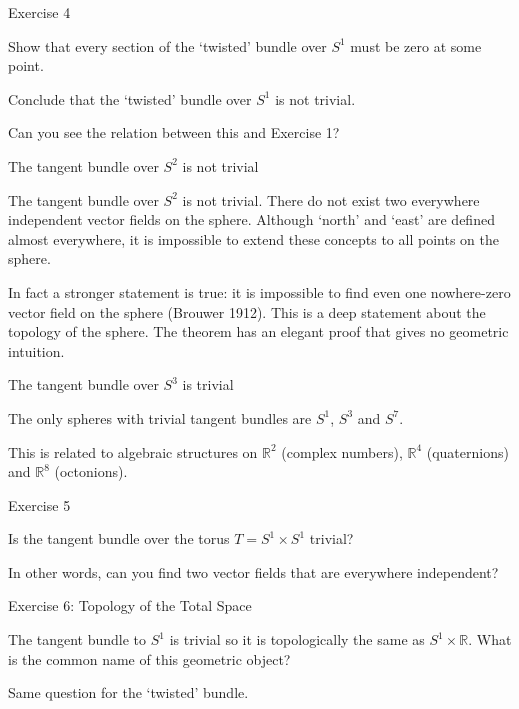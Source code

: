 \documentclass{beamer}
\begin{document}
\begin{frame}{Exercise 4}

Show that every section of the `twisted' bundle over $S^1$ must be zero at some point.

Conclude that the `twisted' bundle over $S^1$ is not trivial.

Can you see the relation between this and Exercise 1?

\end{frame}


\begin{frame}{The tangent bundle over $S^2$ is not trivial}

The tangent bundle over $S^2$ is not trivial. There do not exist two everywhere independent vector fields on the sphere. Although `north' and `east' are defined almost everywhere, it is impossible to extend these concepts to all points on the sphere.

In fact a stronger statement is true: it is impossible to find even one nowhere-zero vector field on the sphere (Brouwer 1912). This is a deep statement about the topology of the sphere. The theorem has an elegant proof that gives no geometric intuition.

\end{frame}

\begin{frame}{The tangent bundle over $S^3$ is trivial}

The only spheres with trivial tangent bundles are $S^1$, $S^3$ and $S^7$.

This is related to algebraic structures on $\mathbb{R}^2$ (complex numbers), $\mathbb{R}^4$ (quaternions) and $\mathbb{R}^8$ (octonions).

\end{frame}

\begin{frame}{Exercise 5}

Is the tangent bundle over the torus $T = S^1 \times S^1$ trivial?

In other words, can you find two vector fields that are everywhere independent?

\end{frame}

\begin{frame}{Exercise 6: Topology of the Total Space}

The tangent bundle to $S^1$ is trivial so it is topologically the same as $S^1 \times \mathbb{R}$. What is the common name of this geometric object?

Same question for the `twisted' bundle.

\end{frame}
\end{document}
